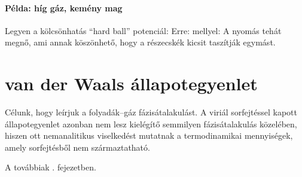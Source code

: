    \paragraph{Példa: híg gáz, kemény mag}
    
    Legyen a kölcsönhatás ``hard ball'' potenciál:
    Erre:
    mellyel:
    A nyomás tehát megnő, ami annak köszönhető, hogy a részecskék kicsit taszítják egymást. 
    
 \section{van der Waals állapotegyenlet}
  
  Célunk, hogy leírjuk a folyadák--gáz fázisátalakulást. A viriál sorfejtéssel kapott állapotegyenlet azonban nem lesz kielégítő semmilyen fázisátalakulás közelében, hiszen ott nemanalitikus viselkedést mutatnak a termodinamikai mennyiségek, amely sorfejtésből nem származtatható.
  
  A továbbiak . fejezetben.